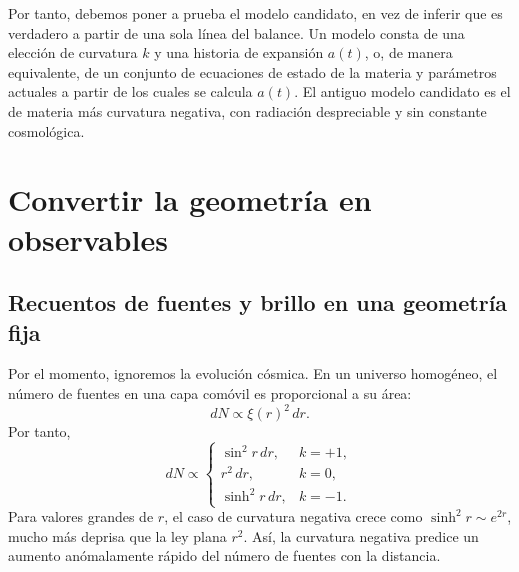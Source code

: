 \begin{classroomqa}
\end{classroomqa}

Por tanto, debemos poner a prueba el modelo candidato, en vez de inferir que es verdadero a partir de una sola línea del balance. Un modelo consta de una elección de curvatura \(k\) y una historia de expansión \(a(t)\), o, de manera equivalente, de un conjunto de ecuaciones de estado de la materia y parámetros actuales a partir de los cuales se calcula \(a(t)\). El antiguo modelo candidato es el de materia más curvatura negativa, con radiación despreciable y sin constante cosmológica.

\section{Convertir la geometría en observables}

\subsection{Recuentos de fuentes y brillo en una geometría fija}

Por el momento, ignoremos la evolución cósmica. En un universo homogéneo, el número de fuentes en una capa comóvil es proporcional a su área:
\begin{equation}
dN\propto \xi(r)^2\,dr.
\label{eq:c06-shell-count}
\end{equation}
Por tanto,
\begin{equation}
dN\propto
\begin{cases}
\sin^2r\,dr, & k=+1,\\
r^2\,dr, & k=0,\\
\sinh^2r\,dr, & k=-1.
\end{cases}
\end{equation}
Para valores grandes de \(r\), el caso de curvatura negativa crece como \(\sinh^2r\sim e^{2r}\), mucho más deprisa que la ley plana \(r^2\). Así, la curvatura negativa predice un aumento anómalamente rápido del número de fuentes con la distancia.

